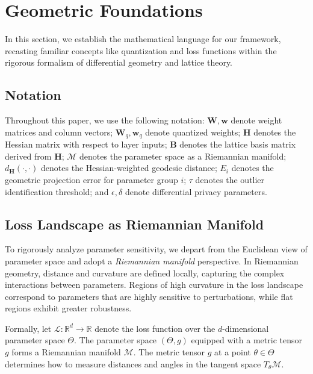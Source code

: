 \documentclass[letterpaper,twocolumn,10pt]{article}
\begin{document}
\section{Geometric Foundations}
\label{sec:background}

In this section, we establish the mathematical language for our framework, recasting familiar concepts like quantization and loss functions within the rigorous formalism of differential geometry and lattice theory.

\subsection{Notation}

Throughout this paper, we use the following notation: $\mathbf{W}, \mathbf{w}$ denote weight matrices and column vectors; $\mathbf{W}_q, \mathbf{w}_q$ denote quantized weights; $\mathbf{H}$ denotes the Hessian matrix with respect to layer inputs; $\mathbf{B}$ denotes the lattice basis matrix derived from $\mathbf{H}$; $\mathcal{M}$ denotes the parameter space as a Riemannian manifold; $d_{\mathbf{H}}(\cdot, \cdot)$ denotes the Hessian-weighted geodesic distance; $E_i$ denotes the geometric projection error for parameter group $i$; $\tau$ denotes the outlier identification threshold; and $\epsilon, \delta$ denote differential privacy parameters.

\subsection{Loss Landscape as Riemannian Manifold}

To rigorously analyze parameter sensitivity, we depart from the Euclidean view of parameter space and adopt a \emph{Riemannian manifold} perspective. In Riemannian geometry, distance and curvature are defined locally, capturing the complex interactions between parameters. Regions of high curvature in the loss landscape correspond to parameters that are highly sensitive to perturbations, while flat regions exhibit greater robustness.

Formally, let $\mathcal{L}: \mathbb{R}^d \to \mathbb{R}$ denote the loss function over the $d$-dimensional parameter space $\Theta$. The parameter space $(\Theta, g)$ equipped with a metric tensor $g$ forms a Riemannian manifold $\mathcal{M}$. The metric tensor $g$ at a point $\theta \in \Theta$ determines how to measure distances and angles in the tangent space $T_\theta \mathcal{M}$.
\end{document}
